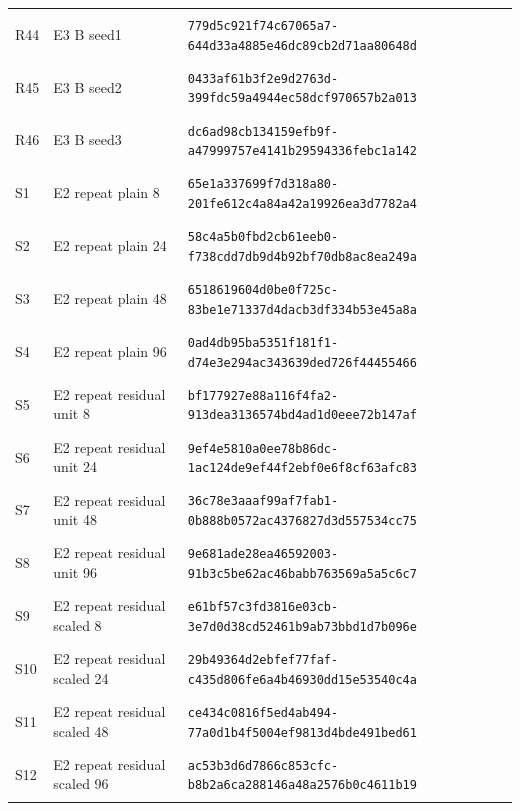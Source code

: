 \begin{longtable}{@{}l>{\raggedright\arraybackslash}p{3.5cm}p{10.8cm}@{}}
\hypertarget{R44}{R44} & E3 B seed1 & {\fontsize{8.8}{11}\selectfont\texttt{779d5c921f74c67065a7-644d33a4885e46dc89cb2d71aa80648d}} \\
\hypertarget{R45}{R45} & E3 B seed2 & {\fontsize{8.8}{11}\selectfont\texttt{0433af61b3f2e9d2763d-399fdc59a4944ec58dcf970657b2a013}} \\
\hypertarget{R46}{R46} & E3 B seed3 & {\fontsize{8.8}{11}\selectfont\texttt{dc6ad98cb134159efb9f-a47999757e4141b29594336febc1a142}} \\
\hypertarget{S1}{S1} & E2 repeat plain 8 & {\fontsize{8.8}{11}\selectfont\texttt{65e1a337699f7d318a80-201fe612c4a84a42a19926ea3d7782a4}} \\
\hypertarget{S2}{S2} & E2 repeat plain 24 & {\fontsize{8.8}{11}\selectfont\texttt{58c4a5b0fbd2cb61eeb0-f738cdd7db9d4b92bf70db8ac8ea249a}} \\
\hypertarget{S3}{S3} & E2 repeat plain 48 & {\fontsize{8.8}{11}\selectfont\texttt{6518619604d0be0f725c-83be1e71337d4dacb3df334b53e45a8a}} \\
\hypertarget{S4}{S4} & E2 repeat plain 96 & {\fontsize{8.8}{11}\selectfont\texttt{0ad4db95ba5351f181f1-d74e3e294ac343639ded726f44455466}} \\
\hypertarget{S5}{S5} & E2 repeat residual unit 8 & {\fontsize{8.8}{11}\selectfont\texttt{bf177927e88a116f4fa2-913dea3136574bd4ad1d0eee72b147af}} \\
\hypertarget{S6}{S6} & E2 repeat residual unit 24 & {\fontsize{8.8}{11}\selectfont\texttt{9ef4e5810a0ee78b86dc-1ac124de9ef44f2ebf0e6f8cf63afc83}} \\
\hypertarget{S7}{S7} & E2 repeat residual unit 48 & {\fontsize{8.8}{11}\selectfont\texttt{36c78e3aaaf99af7fab1-0b888b0572ac4376827d3d557534cc75}} \\
\hypertarget{S8}{S8} & E2 repeat residual unit 96 & {\fontsize{8.8}{11}\selectfont\texttt{9e681ade28ea46592003-91b3c5be62ac46babb763569a5a5c6c7}} \\
\hypertarget{S9}{S9} & E2 repeat residual scaled 8 & {\fontsize{8.8}{11}\selectfont\texttt{e61bf57c3fd3816e03cb-3e7d0d38cd52461b9ab73bbd1d7b096e}} \\
\hypertarget{S10}{S10} & E2 repeat residual scaled 24 & {\fontsize{8.8}{11}\selectfont\texttt{29b49364d2ebfef77faf-c435d806fe6a4b46930dd15e53540c4a}} \\
\hypertarget{S11}{S11} & E2 repeat residual scaled 48 & {\fontsize{8.8}{11}\selectfont\texttt{ce434c0816f5ed4ab494-77a0d1b4f5004ef9813d4bde491bed61}} \\
\hypertarget{S12}{S12} & E2 repeat residual scaled 96 & {\fontsize{8.8}{11}\selectfont\texttt{ac53b3d6d7866c853cfc-b8b2a6ca288146a48a2576b0c4611b19}} \\
\bottomrule\end{longtable}\endgroup
